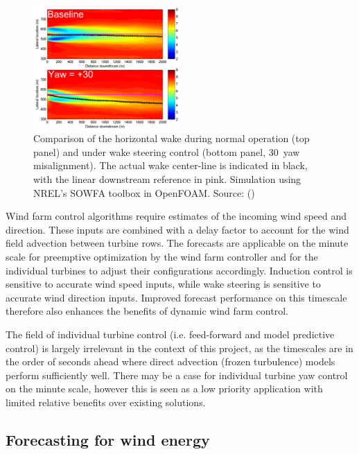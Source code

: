 \begin{figure}[htbp]
    \centering
        \includegraphics[width=0.5\textwidth]{graphics/intro/wake_steering.png}
    \caption{Comparison of the horizontal wake during normal operation (top panel) and under wake steering control (bottom panel, 30\degree \ yaw misalignment). The actual wake center-line is indicated in black, with the linear downstream reference in pink. Simulation using NREL's SOWFA toolbox in OpenFOAM. Source: (\cite{fleming_wakesteering_2014})}
    \label{fig:wake_steering}
\end{figure}

Wind farm control algorithms require estimates of the incoming wind speed and direction. These inputs are combined with a delay factor to account for the wind field advection between turbine rows. The forecasts are applicable on the minute scale for preemptive optimization by the wind farm controller and for the individual turbines to adjust their configurations accordingly. Induction control is sensitive to accurate wind speed inputs, while wake steering is sensitive to accurate wind direction inputs. Improved forecast performance on this timescale therefore also enhances the benefits of dynamic wind farm control.

The field of individual turbine control (i.e. feed-forward and model predictive control) is largely irrelevant in the context of this project, as the timescales are in the order of seconds ahead where direct advection (frozen turbulence) models perform sufficiently well. There may be a case for individual turbine yaw control on the minute scale, however this is seen as a low priority application with limited relative benefits over existing solutions.

\clearpage
\subsection{Forecasting for wind energy}
\label{sec:intro_forecasting}

